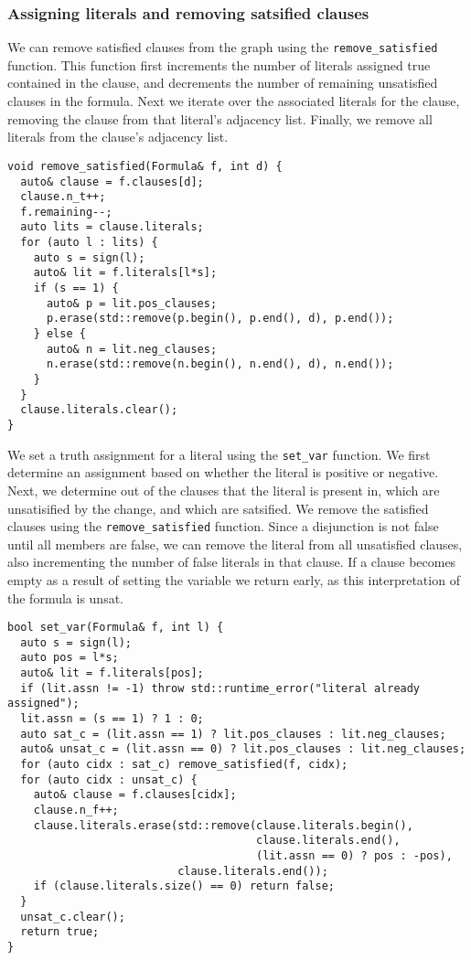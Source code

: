 \documentclass[10pt,AMS Euler]{article}
\begin{document}
\subsubsection{Assigning literals and removing satsified clauses}
\label{sec:org87c3748}
We can remove satisfied clauses from the graph using the \texttt{remove\_satisfied}
function. This function first increments the number of literals assigned true
contained in the clause, and decrements the number of remaining unsatisfied
clauses in the formula. Next we iterate over the associated literals for the clause,
removing the clause from that literal's adjacency list. Finally, we remove all literals
from the clause's adjacency list.
\begin{verbatim}
void remove_satisfied(Formula& f, int d) {
  auto& clause = f.clauses[d];
  clause.n_t++;
  f.remaining--;
  auto lits = clause.literals;
  for (auto l : lits) {
    auto s = sign(l);
    auto& lit = f.literals[l*s];
    if (s == 1) {
      auto& p = lit.pos_clauses;
      p.erase(std::remove(p.begin(), p.end(), d), p.end());
    } else {
      auto& n = lit.neg_clauses;
      n.erase(std::remove(n.begin(), n.end(), d), n.end());
    }
  }
  clause.literals.clear();
}
\end{verbatim}
We set a truth assignment for a literal using the \texttt{set\_var} function.
We first determine an assignment based on whether the literal is positive or negative.
Next, we determine out of the clauses that the literal is present in, which are unsatisified
by the change, and which are satsified. We remove the satisfied clauses using the
\texttt{remove\_satisfied} function. Since a disjunction is not false until all members are false,
we can remove the literal from all unsatisfied clauses, also incrementing the number
of false literals in that clause. If a clause becomes empty as a result of setting the
variable we return early, as this interpretation of the formula is unsat.
\begin{verbatim}
bool set_var(Formula& f, int l) {
  auto s = sign(l);
  auto pos = l*s;
  auto& lit = f.literals[pos];
  if (lit.assn != -1) throw std::runtime_error("literal already assigned");
  lit.assn = (s == 1) ? 1 : 0;
  auto sat_c = (lit.assn == 1) ? lit.pos_clauses : lit.neg_clauses;
  auto& unsat_c = (lit.assn == 0) ? lit.pos_clauses : lit.neg_clauses;
  for (auto cidx : sat_c) remove_satisfied(f, cidx);
  for (auto cidx : unsat_c) {
    auto& clause = f.clauses[cidx];
    clause.n_f++;
    clause.literals.erase(std::remove(clause.literals.begin(),
                                      clause.literals.end(),
                                      (lit.assn == 0) ? pos : -pos),
                          clause.literals.end());
    if (clause.literals.size() == 0) return false;
  }
  unsat_c.clear();
  return true;
}
\end{verbatim}
\end{document}

